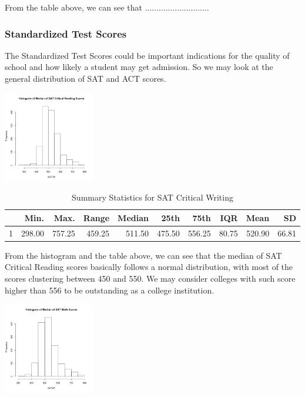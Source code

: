 \documentclass{article}\usepackage[]{graphicx}\usepackage[]{color}
\begin{document}
From the table above, we can see that ............................


\subsubsection{Standardized Test Scores}

The Standardized Test Scores could be important indications for the quality of school and how likely a student may get admission. So we may look at the general distribution of SAT and ACT scores.



{\centering \includegraphics[width=150px]{../images/histogram-SATCRMedian} 

}


\begin{table}[ht]
\centering
\begin{tabular}{rrrrrrrrrr}
  \hline
 & Min. & Max. & Range & Median & 25th & 75th & IQR & Mean & SD \\ 
  \hline
1 & 298.00 & 757.25 & 459.25 & 511.50 & 475.50 & 556.25 & 80.75 & 520.90 & 66.81 \\ 
   \hline
\end{tabular}
\caption{Summary Statistics for SAT Critical Writing} 
\end{table}


From the histogram and the table above, we can see that the median of SAT Critical Reading scores basically follows a normal distribution, with most of the scores clustering between 450 and 550. We may consider colleges with such score higher than 556 to be outstanding as a college institution.



{\centering \includegraphics[width=150px]{../images/histogram-SATMTMedian} 

}
\end{document}
